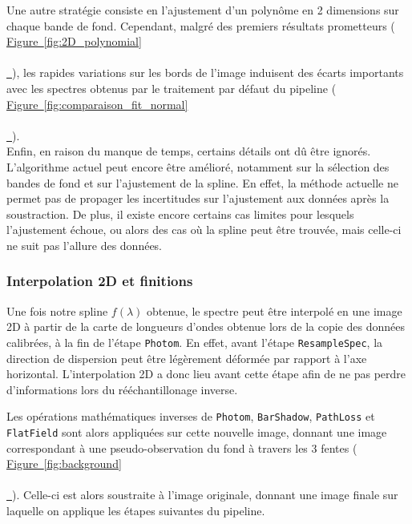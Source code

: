 \documentclass[12pt, a4paper]{article}
\newcommand*{\figref}[2][]{%
  \hyperref[{#2}]{%
    Figure~\ref*{#2}%
    \ifx\\#1\\%
    \else
      \,#1%
    \fi
  }%
}
\begin{document}
Une autre stratégie consiste en l'ajustement d'un polynôme en 2 dimensions sur chaque bande de fond. Cependant, malgré des premiers résultats prometteurs (\figref{fig:2D_polynomial}), les rapides variations sur les bords de l'image induisent des écarts importants avec les spectres obtenus par le traitement par défaut du pipeline (\figref{fig:comparaison_fit_normal}).\\

Enfin, en raison du manque de temps, certains détails ont dû être ignorés. L'algorithme actuel peut encore être amélioré, notamment sur la sélection des bandes de fond et sur l'ajustement de la spline. En effet, la méthode actuelle ne permet pas de propager les incertitudes sur l'ajustement aux données après la soustraction. De plus, il existe encore certains cas limites pour lesquels l'ajustement échoue, ou alors des cas où la spline peut être trouvée, mais celle-ci ne suit pas l'allure des données.


\subsubsection{Interpolation 2D et finitions}

Une fois notre spline $f(\lambda)$ obtenue, le spectre peut être interpolé en une image 2D à partir de la carte de longueurs d'ondes obtenue lors de la copie des données calibrées, à la fin de l'étape \texttt{Photom}. En effet, avant l'étape \texttt{ResampleSpec}, la direction de dispersion peut être légèrement déformée par rapport à l'axe horizontal. L'interpolation 2D a donc lieu avant cette étape afin de ne pas perdre d'informations lors du rééchantillonage inverse.

Les opérations mathématiques inverses de \texttt{Photom}, \texttt{BarShadow}, \texttt{PathLoss} et \texttt{FlatField} sont alors appliquées sur cette nouvelle image, donnant une image correspondant à une pseudo-observation du fond à travers les 3 fentes (\figref{fig:background}). Celle-ci est alors soustraite à l'image originale, donnant une image finale sur laquelle on applique les étapes suivantes du pipeline.
\end{document}
